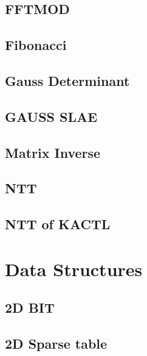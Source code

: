 \subsection{FFTMOD}
\raggedbottom
\hrulefill
\subsection{Fibonacci}
\raggedbottom
\hrulefill
\subsection{Gauss Determinant}
\raggedbottom
\hrulefill
\subsection{GAUSS SLAE}
\raggedbottom
\hrulefill
\subsection{Matrix Inverse}
\raggedbottom
\hrulefill
\subsection{NTT}
\raggedbottom
\hrulefill
\subsection{NTT of KACTL}
\raggedbottom
\hrulefill

\section{Data Structures}
\subsection{2D BIT}
\raggedbottom
\hrulefill
\subsection{2D Sparse table}
\raggedbottom
\hrulefill
